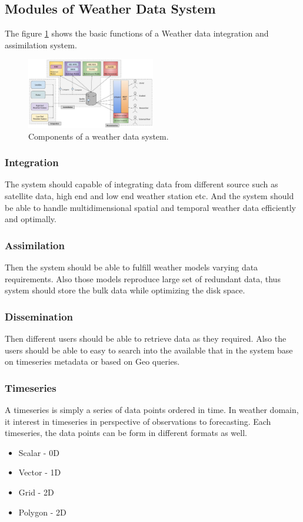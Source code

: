 \subsection{Modules of Weather Data System}
The figure \ref{fi:wdia_components} shows the basic functions of a Weather data integration and assimilation system.
\begin{figure}[htbp]
\centerline{\includegraphics[width=0.5\textwidth]{method/misc/weather_data_system_components.jpg}}
\caption{Components of a weather data system.}
\label{fi:wdia_components}
\end{figure}
\subsubsection{Integration}
The system should capable of integrating data from different source such as satellite data, high end and low end weather station etc. And the system should be able to handle multidimensional spatial and temporal weather data efficiently and optimally. 
\subsubsection{Assimilation}
Then the system should be able to fulfill weather models varying data requirements. Also those models reproduce large set of redundant data, thus system should store the bulk data while optimizing the disk space.
\subsubsection{Dissemination}
Then different users should be able to retrieve data as they required. Also the users should be able to easy to search into the available that in the system base on timeseries metadata or based on Geo queries.

\subsubsection{Timeseries}
A timeseries is simply a series of data points ordered in time. In weather domain, it interest in timeseries in perspective of observations to forecasting.
Each timeseries, the data points can be form in different formats as well.
\begin{itemize} 
    \item Scalar - 0D
    \item Vector - 1D
    \item Grid - 2D
    \item Polygon - 2D
\end{itemize}
    

